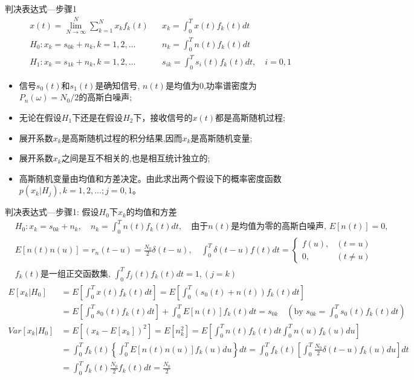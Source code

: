 \begin{frame}[shrink]{判决表达式---步骤1}
\begin{align*}
&x(t)=\lim\limits_{N\to\infty}^N\sum\limits_{k=1}^Nx_kf_k(t)&&x_k=\int_{0}^{T}x(t)f_k(t)dt \\
&H_0: x_k=s_{0k}+n_k,k=1,2,\dots &&n_k=\int_{0}^{T}n(t)f_k(t)dt\\
&H_1: x_k=s_{1k}+n_k,k=1,2,\dots &&s_{ik}=\int_{0}^{T}s_i(t)f_k(t)dt, \quad i=0,1
\end{align*}
\begin{itemize}
\item 信号$s_0(t)$和$s_1(t)$是确知信号, $n(t)$是均值为0,功率谱密度为$P_n(\omega)=N_0/2$的高斯白噪声;
\item 无论在假设$H_1$下还是在假设$H_2$下，接收信号的$x(t)$都是高斯随机过程;
\item 展开系数$x_k$是高斯随机过程的积分结果,因而$x_k$是高斯随机变量;
\item 展开系数$x_k$之间是互不相关的,也是相互统计独立的;
\item 高斯随机变量由均值和方差决定。由此求出两个假设下的概率密度函数$p(x_k|H_j),k=1,2,\dots;j=0,1$。
\end{itemize}
\end{frame}

\begin{frame}[shrink]{判决表达式---步骤1: 假设$H_0$下$x_k$的均值和方差}
\begin{align*}
&H_0: x_k=s_{0k}+n_k, \quad n_k=\int_{0}^{T}n(t)f_k(t)dt, \quad\text{由于$n(t)$是均值为零的高斯白噪声, } E[n(t)]=0, \\ &E[n(t)n(u)]=r_n(t-u)=\frac{N_0}{2}\delta(t-u), \quad
\int_0^T\delta(t-u)f(t)dt=
\begin{cases}
f(u), & (t=u)\\
0, & (t\ne u) 
\end{cases}\\
&\text{$f_k(t)$是一组正交函数集, } \int_{0}^{T}f_j(t)f_k(t)dt=1,(j=k)
\end{align*}
\begin{align*}
E[x_k|H_0]&=E\left[\int_{0}^{T}x(t)f_k(t)dt\right]=E\left[\int_{0}^{T}(s_0(t)+n(t))f_k(t)dt\right]\\
&=E\left[\int_{0}^{T}s_0(t)f_k(t)dt\right]+\int_{0}^{T}E[n(t)]f_k(t)dt=s_{0k}\quad (\text{by }s_{0k}=\int_{0}^{T}s_0(t)f_k(t)dt)\\
Var[x_k|H_0]&=E[(x_k-E[x_k])^2]=E[n_k^2]=E\left[\int_{0}^{T}n(t)f_k(t)dt\int_{0}^{T}n(u)f_k(u)du\right]\\
&=\int_{0}^{T}f_k(t)\left\{\int_{0}^{T}E[n(t)n(u)]f_k(u)du\right\}dt=\int_{0}^{T}f_k(t)\left[\int_{0}^{T}\frac{N_0}{2}\delta(t-u)f_k(u)du\right]dt\\
&=\int_{0}^{T}f_k(t)\frac{N_0}{2}f_k(t)dt=\frac{N_0}{2}
\end{align*}
\end{frame}

